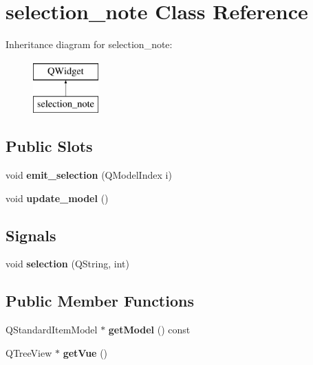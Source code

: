 \hypertarget{classselection__note}{}\section{selection\+\_\+note Class Reference}
\label{classselection__note}
Inheritance diagram for selection\+\_\+note\+:\begin{figure}[H]
\begin{center}
\leavevmode
\includegraphics[height=2.000000cm]{classselection__note}
\end{center}
\end{figure}
\subsection*{Public Slots}
\begin{DoxyCompactItemize}
\item 
\mbox{\label{classselection__note_a70f407c89a87e5d8ce992f18ef64773d}} 
void {\bfseries emit\+\_\+selection} (Q\+Model\+Index i)
\item 
\mbox{\label{classselection__note_aab004424eba4264628d2e01108f2e63b}} 
void {\bfseries update\+\_\+model} ()
\end{DoxyCompactItemize}
\subsection*{Signals}
\begin{DoxyCompactItemize}
\item 
\mbox{\label{classselection__note_ae1cc0e50817dcb45975fa33c9231ef0b}} 
void {\bfseries selection} (Q\+String, int)
\end{DoxyCompactItemize}
\subsection*{Public Member Functions}
\begin{DoxyCompactItemize}
\item 
\mbox{\label{classselection__note_a87ea63b64611ba8668ab50affd116aea}} 
Q\+Standard\+Item\+Model $\ast$ {\bfseries get\+Model} () const
\item 
\mbox{\label{classselection__note_aa4468145cd30e1fab18f3f7c2b5437aa}} 
Q\+Tree\+View $\ast$ {\bfseries get\+Vue} ()
\end{DoxyCompactItemize}


